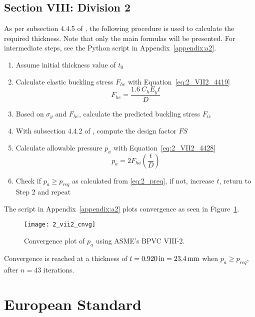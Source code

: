 \subsection{Section VIII: Division 2}
\label{section:2_VIII2}
As per subsection 4.4.5 of \cite{ASMEbvpcVII2}, the following procedure is used to calculate the required thickness. Note that only the main formulas will be presented. For intermediate steps, see  the Python script in Appendix~\ref{appendix:a2}.
\begin{enumerate}
	\item Assume initial thickness value of $t_0$
	\item Calculate elastic buckling stress $F_{he}$ with Equation~\ref{eq:2_VII2_4419}
	      \begin{equation}
	      	\label{eq:2_VII2_4419}
	      	F_{he} = \frac{1.6\ C_h E_y t}{D}
	      \end{equation}
	\item Based on $\sigma_y$ and $F_{he}$, calculate the predicted buckling stress $F_{ic}$
	\item With subsection 4.4.2 of \cite{ASMEbvpcVII2}, compute the design factor $FS$
	\item Calculate allowable pressure $p_a$ with Equation~\ref{eq:2_VII2_4428}
	      \begin{equation}
	      	\label{eq:2_VII2_4428}
	      	p_a = 2 F_{ha} \left(\frac{t}{D}\right)
	      \end{equation}
	\item Check if $p_a \geq p_{req}$ as calculated from \ref{eq:2_preq}, if not, increase $t$, return to Step 2 and repeat \\
	      	
\end{enumerate}

The script in Appendix~\ref{appendix:a2} plots convergence as seen in Figure~\ref{fig:2_vii2_cnvg}.
\begin{figure}[H]
	\centering
	\texttt{[image: 2\_vii2\_cnvg]}
	\caption{Convergence plot of $p_a$ using ASME's BPVC VIII-2.}
	\label{fig:2_vii2_cnvg}
\end{figure}

Convergence is reached at a thickness of $t = 0.920\,\mathrm{in}= 23.4\,\mathrm{mm}$ when $p_a\geq p_{req}$, after $n=43$ iterations. 


\section{European Standard}
